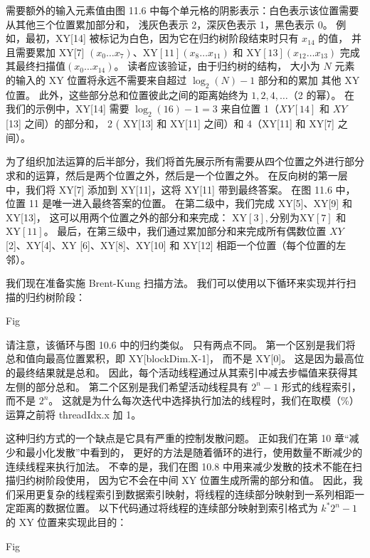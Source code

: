 需要额外的输入元素值由图 11.6 中每个单元格的阴影表示：白色表示该位置需要从其他三个位置累加部分和，
浅灰色表示 2，深灰色表示 1，黑色表示 0。 
例如，最初，XY[14] 被标记为白色，因为它在归约树阶段结束时只有 $x_{14}$ 的值，
并且需要累加 XY[7] $\left(x_ {0} \ldots x_{7}\right)、\mathrm{XY}[11]\left(x_{8} \ldots x_{11}\right)$ 
和 $\mathrm{XY}[13]\left(x_{12} \ldots x_{13}\right)$ 
完成其最终扫描值$\left(x_{0} \ldots x_{14}\right)$。 
读者应该验证，由于归约树的结构，
大小为 $N$ 元素的输入的 XY 位置将永远不需要来自超过 $\log _{2}(N)-1$ 部分和的累加 其他 XY 位置。 
此外，这些部分总和位置彼此之间的距离始终为 $1,2,4, \ldots$（2 的幂）。 
在我们的示例中，XY[14] 需要 $\log _{2}(16)-1=3$ 来自位置 1（$X Y[14]$ 和 $X Y$ [13] 之间）的部分和，
2 ( XY[13] 和 XY[11] 之间）和 4（XY[11] 和 XY[7] 之间）。

为了组织加法运算的后半部分，我们将首先展示所有需要从四个位置之外进行部分求和的运算，然后是两个位置之外，然后是一个位置之外。 
在反向树的第一层中，我们将 XY[7] 添加到 XY[11]，这将 XY[11] 带到最终答案。 
在图 11.6 中，位置 11 是唯一进入最终答案的位置。 
在第二级中，我们完成 XY[5]、XY[9] 和 XY[13]，
这可以用两个位置之外的部分和来完成： $\mathrm{XY}[3], \mathrm{ 分别为 XY}[7]$ 和 $\mathrm{XY}[11]$。 
最后，在第三级中，我们通过累加部分和来完成所有偶数位置 $X Y$ [2]、XY[4]、XY [6]、XY[8]、XY[10] 和 XY[12] 相距一个位置（每个位置的左邻）。

我们现在准备实施 Brent-Kung 扫描方法。 我们可以使用以下循环来实现并行扫描的归约树阶段：

{\color{red} Fig}

请注意，该循环与图 10.6 中的归约类似。 只有两点不同。 第一个区别是我们将总和值向最高位置累积，即 XY[blockDim.X-1]，
而不是 XY[0]。 这是因为最高位的最终结果就是总和。 因此，每个活动线程通过从其索引中减去步幅值来获得其左侧的部分总和。 
第二个区别是我们希望活动线程具有 $2^{n}-1$ 形式的线程索引，而不是 $2^{n}$。 
这就是为什么每次迭代中选择执行加法的线程时，我们在取模（\%）运算之前将 threadIdx.x 加 1。

这种归约方式的一个缺点是它具有严重的控制发散问题。 正如我们在第 10 章“减少和最小化发散”中看到的，
更好的方法是随着循环的进行，使用数量不断减少的连续线程来执行加法。 
不幸的是，我们在图 10.8 中用来减少发散的技术不能在扫描归约树阶段使用，
因为它不会在中间 $\mathrm{XY}$ 位置生成所需的部分和值。 
因此，我们采用更复杂的线程索引到数据索引映射，将线程的连续部分映射到一系列相距一定距离的数据位置。 
以下代码通过将线程的连续部分映射到索引格式为 $k^{*} 2^{n}-1$ 的 XY 位置来实现此目的：

{\color{red} Fig}

